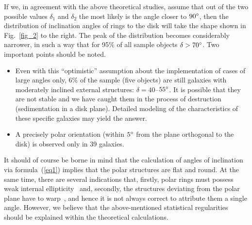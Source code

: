 \documentclass{ab}
\def\degr{\hbox{$^\circ$}}
\begin{document}
If we, in agreement with the above theoretical studies,
assume that out of the two possible values  $\delta_1$ and
$\delta_2$ the most likely is the angle closer to $90\degr$, then
the distribution of inclination angles of rings to the disk will
take the shape shown in Fig.~\ref{fig_2} to the right.
The peak of the distribution becomes considerably narrower, in
such a way that for 95\% of all sample objects $\delta>70\degr$.
Two important points should be noted.
\begin{itemize}
\item Even with this ``optimistic'' assumption about the
implementation of cases of large angles only,  6\% of the sample
(five objects) are still galaxies with moderately inclined
external structures:  \mbox{$\delta=40$--$55\degr$}.  It is
possible that they are not stable and we have caught them in the
process of destruction (sedimentation in a disk plane). Detailed
modeling of the characteristics of these specific galaxies may
yield the answer. 

\item A precisely polar orientation (within
$5\degr$ from the plane orthogonal to the disk) is observed only
in 39 galaxies.
\end{itemize}







It should of course be borne in mind that the calculation of
angles of inclination via formula~(\ref{eq1}) implies
that the polar structures are flat and round. At the same time,
there are several indications that, firstly, polar rings must
possess weak internal ellipticity~\citep{Iodice2003}
and, secondly, the structures deviating from the polar plane have
to warp~\citep{Sparke1986}, and hence it is not always
correct to attribute them a single angle. However, we believe that
the above-mentioned statistical regularities should be explained
within the theoretical calculations.
\end{document}
